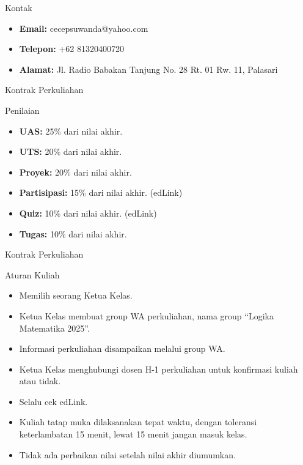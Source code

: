 \documentclass[handout]{beamer}
\begin{document}
	\begin{frame}{Kontak}
		\begin{itemize}
			\item \textbf{Email:} cecepsuwanda@yahoo.com
			\item \textbf{Telepon:} +62 81320400720
			\item \textbf{Alamat:} Jl. Radio Babakan Tanjung No. 28 Rt. 01 Rw. 11, Palasari
		\end{itemize}
	\end{frame}
	
	\begin{frame}{Kontrak Perkuliahan}
		\begin{block}{Penilaian}
			\begin{itemize}
				\item \textbf{UAS:} 25\% dari nilai akhir. 
				\item \textbf{UTS:} 20\% dari nilai akhir. 
				\item \textbf{Proyek:} 20\% dari nilai akhir.
				\item \textbf{Partisipasi:} 15\% dari nilai akhir. (edLink)
				\item \textbf{Quiz:} 10\% dari nilai akhir. (edLink)
				\item \textbf{Tugas:} 10\% dari nilai akhir.
			\end{itemize}
		\end{block}
	\end{frame}
	
	\begin{frame}{Kontrak Perkuliahan}		
		\begin{block}{Aturan Kuliah}
			\begin{itemize}
				\item Memilih seorang Ketua Kelas.
				\item Ketua Kelas membuat group WA perkuliahan, nama group ``Logika Matematika 2025''. 
				\item Informasi perkuliahan disampaikan melalui group WA.
				\item Ketua Kelas menghubungi dosen H-1 perkuliahan untuk konfirmasi kuliah atau tidak.
				\item Selalu cek edLink.
				\item Kuliah tatap muka dilaksanakan tepat waktu, dengan toleransi keterlambatan 15 menit, lewat 15 menit jangan masuk kelas.
					\item Tidak ada perbaikan nilai setelah nilai akhir diumumkan.							
			\end{itemize}
		\end{block}
	\end{frame}
\end{document}
